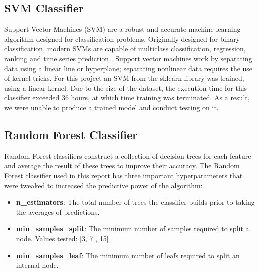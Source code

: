 \documentclass{report}
\begin{document}
	\subsection{SVM Classifier}
	Support Vector Machines (SVM) are a robust and accurate machine learning algorithm designed for classification problems. Originally designed for binary classification, modern SVMs are capable of multiclass classification, regression, ranking and time series prediction \autocite{KarlPersson}. Support vector machines work by separating data using a linear line or hyperplane; separating nonlinear data requires the use of kernel tricks.
	For this project an SVM from the sklearn library was trained, using a linear kernel. Due to the size of the dataset, the execution time for this classifier exceeded 36 hours, at which time training was terminated. As a result, we were unable to produce a trained model and conduct testing on it.
	\subsection{Random Forest Classifier}
	Random Forest classifiers construct a collection of decision trees for each feature and average the result of these trees to improve their accuracy. 	
	The Random Forest classifier used in this report has three important hyperparameters that were tweaked to increased the predictive power of the algorithm:
	
	\begin{itemize}
		\item {\textbf{n\_estimators}: The total number of trees the classifier builds prior to taking the averages of predictions. 
		}
		\item {\textbf{min\_samples\_split}: The minimum number of samples required to split a node.
		\subitem Values tested: [3, 7 , 15]
		}
		\item {\textbf{min\_samples\_leaf}: The minimum number of leafs required to split an internal node.
		}		
	\end{itemize}
	
\end{document}
